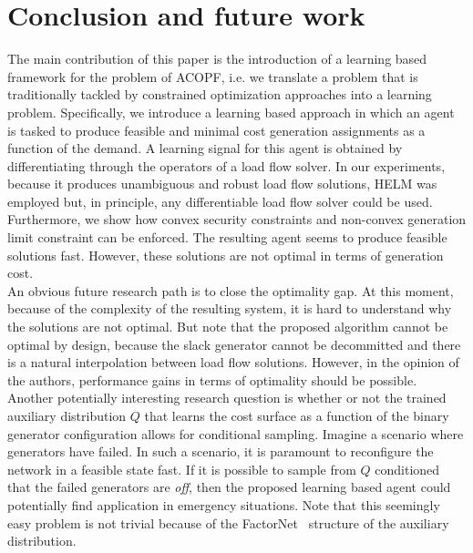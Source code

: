 \section{Conclusion and future work}
\label{sec:LOPFconclusion}
The main contribution of this paper is the introduction of a learning based framework for the problem of ACOPF, i.e. we translate a problem that is traditionally tackled by constrained optimization approaches into a learning problem. Specifically, we introduce a learning based approach in which an agent is tasked to produce feasible and minimal cost generation assignments as a function of the demand. A learning signal for this agent is obtained by differentiating through the operators of a load flow solver. In our experiments, because it produces unambiguous and robust load flow solutions, HELM was employed but, in principle, any differentiable load flow solver could be used. Furthermore, we show how convex security constraints and non-convex generation limit constraint can be enforced. The resulting agent seems to produce feasible solutions fast. However, these solutions are not optimal in terms of generation cost.\\
An obvious future research path is to close the optimality gap. At this moment, because of the complexity of the resulting system, it is hard to understand why the solutions are not optimal. But note that the proposed algorithm cannot be optimal by design, because the slack generator cannot be decommitted and there is a natural interpolation between load flow solutions. However, in the opinion of the authors, performance gains in terms of optimality should be possible.\\
Another potentially interesting research question is whether or not the trained auxiliary distribution $Q$ that learns the cost surface as a function of the binary generator configuration allows for conditional sampling. Imagine a scenario where generators have failed. In such a scenario, it is paramount to reconfigure the network in a feasible state fast. If it is possible to sample from $Q$ conditioned that the failed generators are \emph{off}, then the proposed learning based agent could potentially find application in emergency situations. Note that this seemingly easy problem is not trivial because of the FactorNet~\cite{lange2018factornet} structure of the auxiliary distribution.\\
